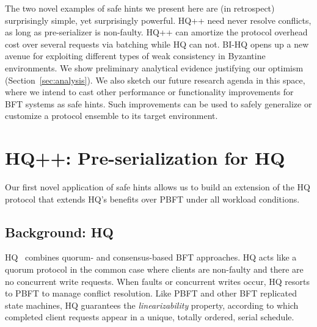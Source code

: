 \documentclass[twocolumn,10pt]{article}
\begin{document}
The two novel examples of safe hints we present here are (in
retrospect) surprisingly simple, yet surprisingly powerful. HQ++ need
never resolve conflicts, as long as pre-serializer is non-faulty. HQ++ can
amortize the protocol overhead cost over several requests via batching while
HQ can not.
BI-HQ opens up a new avenue for exploiting different types of weak consistency
in Byzantine environments.  We show preliminary analytical evidence
justifying our optimism (Section~\ref{sec:analysis}). 
We also sketch our future research
agenda in this space, where we intend to cast other performance or
functionality improvements for BFT systems as safe hints. Such
improvements can be used to safely generalize or customize a protocol ensemble
to its target environment.
\fi





























\section{HQ++: Pre-serialization for HQ}
\label{sec:hq++}

Our first novel application of safe hints allows us to build an
extension of the HQ protocol that extends HQ's benefits over
PBFT under all workload conditions.

\subsection{Background: HQ}

HQ~\cite{hq-replication-osdi-06} combines quorum- and consensus-based
BFT approaches.  HQ acts like a quorum protocol in the common case
where clients are non-faulty and there are no concurrent write
requests.  When faults or concurrent writes occur, HQ resorts to PBFT
to manage conflict resolution.  Like PBFT and other BFT replicated state
machines, HQ guarantees the \emph{linearizability} property, according
to which completed client requests
appear in a unique, totally ordered,  serial  
schedule.
\end{document}
